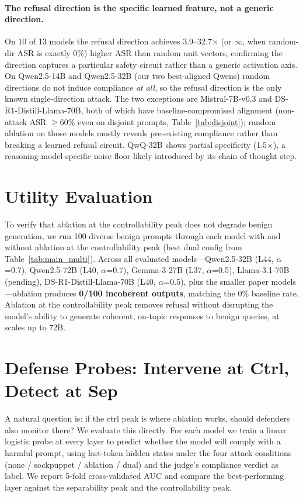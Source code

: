 \documentclass{article}
\begin{document}
\paragraph{The refusal direction is the specific learned feature, not a generic direction.}
On 10 of 13 models the refusal direction achieves 3.9--32.7$\times$ (or $\infty$, when random-dir ASR is exactly 0\%) higher ASR than random unit vectors, confirming the direction captures a particular safety circuit rather than a generic activation axis. On Qwen2.5-14B and Qwen2.5-32B (our two best-aligned Qwens) random directions do not induce compliance \emph{at all}, so the refusal direction is the only known single-direction attack. The two exceptions are Mistral-7B-v0.3 and DS-R1-Distill-Llama-70B, both of which have baseline-compromised alignment (non-attack ASR $\geq 60\%$ even on disjoint prompts, Table~\ref{tab:disjoint}); random ablation on those models mostly reveals pre-existing compliance rather than breaking a learned refusal circuit. QwQ-32B shows partial specificity (1.5$\times$), a reasoning-model-specific noise floor likely introduced by its chain-of-thought step.

\section{Utility Evaluation}
\label{app:utility}

To verify that ablation at the controllability peak does not degrade benign generation, we run 100 diverse benign prompts through each model with and without ablation at the controllability peak (best dual config from Table~\ref{tab:main_multi}). Across all evaluated models---Qwen2.5-32B (L44, $\alpha$=0.7), Qwen2.5-72B (L40, $\alpha$=0.7), Gemma-3-27B (L37, $\alpha$=0.5), Llama-3.1-70B (pending), DS-R1-Distill-Llama-70B (L40, $\alpha$=0.5), plus the smaller paper models---ablation produces \textbf{0/100 incoherent outputs}, matching the 0\% baseline rate. Ablation at the controllability peak removes refusal without disrupting the model's ability to generate coherent, on-topic responses to benign queries, at scales up to 72B.

\section{Defense Probes: Intervene at Ctrl, Detect at Sep}
\label{sec:defense}
\label{app:defense}

A natural question is: if the ctrl peak is where ablation works, should defenders also monitor there? We evaluate this directly. For each model we train a linear logistic probe at every layer to predict whether the model will comply with a harmful prompt, using last-token hidden states under the four attack conditions (none / sockpuppet / ablation / dual) and the judge's compliance verdict as label. We report 5-fold cross-validated AUC and compare the best-performing layer against the separability peak and the controllability peak.
\end{document}

